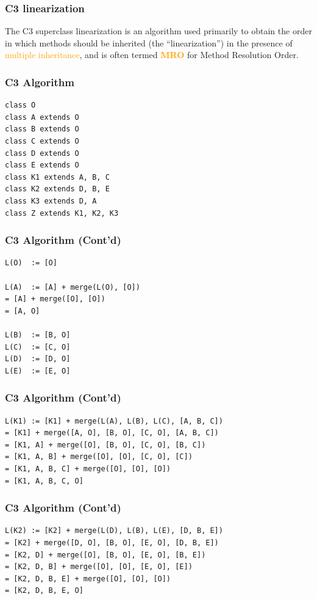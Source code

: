 \documentclass{../py-lecture}
\begin{document}
\begin{frame}
	\frametitle{C3 linearization}
    \begin{block}{}
        The C3 superclass linearization is an algorithm used primarily
        to obtain the order in which methods should
        be inherited (the ``linearization'') in the presence of
        \textcolor{Orange}{multiple inheritance}, and is often termed \textcolor{Orange}{\textbf{MRO}}
        for Method Resolution Order.	
			\end{block}		
\end{frame}

\begin{frame}[fragile]
	\frametitle{C3 Algorithm}
	\begin{verbatim}
class O
class A extends O
class B extends O
class C extends O
class D extends O
class E extends O
class K1 extends A, B, C
class K2 extends D, B, E
class K3 extends D, A
class Z extends K1, K2, K3
	\end{verbatim}
\end{frame}

\begin{frame}[fragile]
	\frametitle{C3 Algorithm (Cont'd)}
	\begin{verbatim}
L(O)  := [O]

L(A)  := [A] + merge(L(O), [O])
= [A] + merge([O], [O])
= [A, O]

L(B)  := [B, O]
L(C)  := [C, O]
L(D)  := [D, O]
L(E)  := [E, O]
	\end{verbatim}
\end{frame}

\begin{frame}[fragile]
	\frametitle{C3 Algorithm (Cont'd)}
	\begin{verbatim}
L(K1) := [K1] + merge(L(A), L(B), L(C), [A, B, C])
= [K1] + merge([A, O], [B, O], [C, O], [A, B, C])
= [K1, A] + merge([O], [B, O], [C, O], [B, C])
= [K1, A, B] + merge([O], [O], [C, O], [C])
= [K1, A, B, C] + merge([O], [O], [O])
= [K1, A, B, C, O]
	\end{verbatim}
\end{frame}

\begin{frame}[fragile]
	\frametitle{C3 Algorithm (Cont'd)}
	\begin{verbatim}
L(K2) := [K2] + merge(L(D), L(B), L(E), [D, B, E])
= [K2] + merge([D, O], [B, O], [E, O], [D, B, E])
= [K2, D] + merge([O], [B, O], [E, O], [B, E])
= [K2, D, B] + merge([O], [O], [E, O], [E])
= [K2, D, B, E] + merge([O], [O], [O])
= [K2, D, B, E, O]
	\end{verbatim}
\end{frame}
\end{document}

